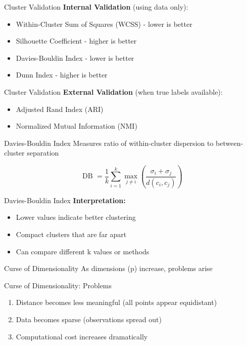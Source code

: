 \documentclass[aspectratio=169,ignorenonframetext]{beamer}
\begin{document}
\begin{frame}{Cluster Validation}
\textbf{Internal Validation} (using data only):

\begin{itemize}
\item
  Within-Cluster Sum of Squares (WCSS) - lower is better
\item
  Silhouette Coefficient - higher is better
\item
  Davies-Bouldin Index - lower is better
\item
  Dunn Index - higher is better
\end{itemize}
\end{frame}

\begin{frame}{Cluster Validation}
\textbf{External Validation} (when true labels available):

\begin{itemize}
\item
  Adjusted Rand Index (ARI)
\item
  Normalized Mutual Information (NMI)
\end{itemize}
\end{frame}

\begin{frame}{Davies-Bouldin Index}
Measures ratio of within-cluster dispersion to between-cluster
separation

\[\text{ DB } = \frac{1}{k}\sum_{i = 1}^{k}\max\limits_{j \neq i}\left( \frac{\sigma_{i} + \sigma_{j}}{d\left( c_{i},c_{j} \right)} \right)\]
\end{frame}

\begin{frame}{Davies-Bouldin Index}
\textbf{Interpretation:}

\begin{itemize}
\item
  Lower values indicate better clustering
\item
  Compact clusters that are far apart
\item
  Can compare different k values or methods
\end{itemize}
\end{frame}

\begin{frame}{Curse of Dimensionality}
As dimensions (p) increase, problems arise
\end{frame}

\begin{frame}{Curse of Dimensionality: Problems}
\begin{enumerate}
\item
  Distance becomes less meaningful (all points appear equidistant)
\item
  Data becomes sparse (observations spread out)
\item
  Computational cost increases dramatically
\end{enumerate}
\end{frame}
\end{document}
